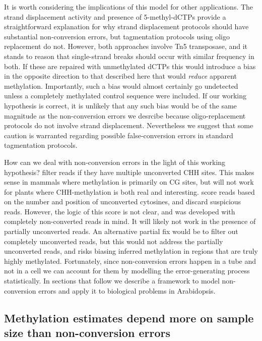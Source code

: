 \documentclass[twocolumn,twoside,lettersize]{article}
\begin{document}
It is worth considering the implications of this model for other applications.
The strand displacement activity and presence of 5-methyl-dCTPs provide a straightforward explanation for why strand displacement protocols should have substantial non-conversion errors, but tagmentation protocols using oligo replacement do not.
However, both approaches involve Tn5 transposase, and it stands to reason that single-strand breaks should occur with similar frequency in both.
If these are repaired with unmethylated dCTPs this would introduce a bias in the opposite direction to that described here that would \textit{reduce} apparent methylation.
Importantly, such a bias would almost certainly go undetected unless a completely methylated control sequence were included.
If our working hypothesis is correct, it is unlikely that any such bias would be of the same magnitude as the non-conversion errors we desrcibe because oligo-replacement protocols do not involve strand displacement.
Nevertheless we suggest that some caution is warranted regarding possible false-conversion errors in standard tagmentation protocols.

How can we deal with non-conversion errors in the light of this working hypothesis?
\textcite{suzuki2018whole} filter reads if they have multiple unconverted CHH sites.
This makes sense in mammals where methylation is primarily on CG sites, but will not work for plants where CHH-methylation is both real and interesting.
\textcite{lu2015improved} score reads based on the number and position of unconverted cytosines, and discard suspicious reads.
However, the logic of this score is not clear, and was developed with completely non-converted reads in mind.
It will likely not work in the presence of partially unconverted reads.
An alternative partial fix would be to filter out completely unconverted reads, but this would not address the partially unconverted reads, and risks biasing inferred methylation in regions that are truly highly methylated.
Fortunately, since non-conversion errors happen in a tube and not in a cell we can account for them by modelling the error-generating process statistically.
In sections that follow we describe a framework to model non-conversion errors and apply it to biological problems in Arabidopsis.

\subsection{Methylation estimates depend more on sample size than non-conversion errors}
\end{document}
